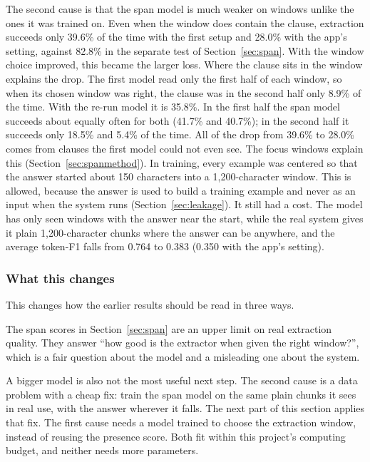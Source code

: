 The second cause is that the span model is much weaker on windows unlike the ones it was trained on. Even when the window does contain the clause, extraction succeeds only 39.6\% of the time with the first setup and 28.0\% with the app's setting, against 82.8\% in the separate test of Section~\ref{sec:span}. With the window choice improved, this became the larger loss. Where the clause sits in the window explains the drop. The first model read only the first half of each window, so when its chosen window was right, the clause was in the second half only 8.9\% of the time. With the re-run model it is 35.8\%. In the first half the span model succeeds about equally often for both (41.7\% and 40.7\%); in the second half it succeeds only 18.5\% and 5.4\% of the time. All of the drop from 39.6\% to 28.0\% comes from clauses the first model could not even see. The focus windows explain this (Section~\ref{sec:spanmethod}). In training, every example was centered so that the answer started about 150 characters into a 1{,}200-character window. This is allowed, because the answer is used to build a training example and never as an input when the system runs (Section~\ref{sec:leakage}). It still had a cost. The model has only seen windows with the answer near the start, while the real system gives it plain 1{,}200-character chunks where the answer can be anywhere, and the average token-F1 falls from 0.764 to 0.383 (0.350 with the app's setting).

\subsubsection{What this changes}
This changes how the earlier results should be read in three ways.

The span scores in Section~\ref{sec:span} are an upper limit on real extraction quality. They answer ``how good is the extractor when given the right window?'', which is a fair question about the model and a misleading one about the system.

A bigger model is also not the most useful next step. The second cause is a data problem with a cheap fix: train the span model on the same plain chunks it sees in real use, with the answer wherever it falls. The next part of this section applies that fix. The first cause needs a model trained to choose the extraction window, instead of reusing the presence score. Both fit within this project's computing budget, and neither needs more parameters.

